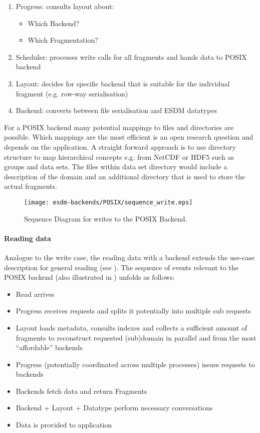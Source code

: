 \begin{enumerate}
	\item Progress: consults layout about:
	\begin{itemize}
		\item Which Backend?
		\item Which Fragmentation?
	\end{itemize}
	\item Scheduler: processes write calls for all fragments and hands data to POSIX backend
	\item Layout: decides for specific backend that is suitable for the individual fragment (e.g. row-way serialisation)
	\item Backend: converts between file serialisation and ESDM datatypes
\end{enumerate}

For a POSIX backend many potential mappings to files and directories are possible.
Which mappings are the most efficient is an open research question and depends on the application.
A straight forward approach is to use directory structure to map hierarchical concepts e.g. from NetCDF or HDF5 such as groups and data sets.
The files within data set directory would include a description of the domain and an additional directory that is used to store the actual fragments.

\begin{figure}
	\centering
	\texttt{[image: esdm-backends/POSIX/sequence\_write.eps]}
	\caption{Sequence Diagram for writes to the POSIX Backend.}
	\label{fig:backend posix sequence write}
\end{figure}



\paragraph{Reading data}

Analogue to the write case, the reading data with a backend extends the use-case description for general reading (see ).
The sequence of events relevant to the POSIX backend (also illustrated in ) unfolds as follows:

\begin{itemize}
	\item Read arrives
	\item Progress receives requests and splits it potentially into multiple sub requests
	\item Layout loads metadata, consults indexes and collects a sufficient amount of fragments to reconstruct requested (sub)domain in parallel and from the most ``affordable'' backends
	\item Progress (potentially coordinated across multiple processes) issues requests to backends
	\item Backends fetch data and return Fragments
	\item Backend + Layout + Datatype perform necessary conversations
	\item Data is provided to application
\end{itemize}




